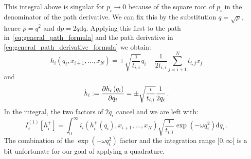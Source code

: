 \documentclass[a4paper,10pt]{article}
\begin{document}
This integral above is singular for $p_i \rightarrow 0$ because of
the square root of $p_i$ in the denominator of the path derivative.
We can fix this by the substitution $q = \sqrt{p}$, hence $p = q^2$
and $\mathrm{d}p = 2 q \mathrm{d}q$. Applying this first to the path
in~\eqref{eq:general_path_formula} and the path derivative in
\eqref{eq:general_path_derivative_formula} we obtain:
\begin{equation}
  h_i\left(q_i, x_{i+1}, \ldots, x_N\right)
  =
  \pm \sqrt{\frac{\imath}{t_{i,i}}} q_i
  -\frac{1}{2 t_{i,i}} \sum_{j=i+1}^{N} t_{i,j} x_j
\end{equation}
and
\begin{equation}
  \dot{h}_i := \frac{\partial h_i\left(q_i\right)}{\partial q_i}
  = \pm \sqrt{\frac{\imath}{t_{i,i}}} \frac{1}{2 q_i} \,.
\end{equation}
In the integral, the two factors of $2 q_i$ cancel and we are
left with:
\begin{equation}
  I_i^{(1)}[h_i^{+}] =
  \int_0^\infty
    i_i\left(h_i^{+}\left(q_i\right), x_{i+1},\ldots,x_N\right)
    \sqrt{\frac{\imath}{t_{i,i}}}
    \exp\left(- \omega q_i^2\right)
  \mathrm{d}q_i \,.
\end{equation}
The combination of the $\exp(-\omega q_i^2)$ factor and the integration range
$[0, \infty[$ is a bit unfortunate for our goal of applying a quadrature.
\end{document}
